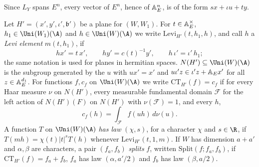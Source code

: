 Since $L_Y$ spans $E^n$, every vector of $E^n$, hence of $\mathbb{A}_E^n$, is of the form $sx+\iota u+ty$.

\begin{definition}\label{pf:thmK-cone:def-ct}
Let $H'=(x',y',\iota',\mathfrak b')$ be a plane for $(W,W_1)$.  For $t\in\mathbb{A}_E^\times$, $h_1\in\Uni(W_1)(\A)$ and
$h\in\Uni(W)(\A)$ we write $\mathrm{Levi}_{H'}(t,h_1,h)$, and call $h$ a \emph{Levi element} $m(t,h_1)$, if
\[
  hx'=t\,x',\qquad hy'=c(t)^{-1}y',\qquad h\,\iota'=\iota'\,h_1 ;
\]
the same notation is used for planes in hermitian spaces.  $N(H')\subseteq\Uni(W)(\A)$ is the subgroup generated by the
$u$ with $ux'=x'$ and $u\iota'z\in\iota'z+\mathbb{A}_E x'$ for all $z\in\mathbb{A}_E^{d_1}$.  For functions $f,c_f$ on
$\Uni(W)(\A)$ we write $\mathrm{CT}_{H'}(f)=c_f$ if for every Haar measure $\nu$ on $N(H')$, every measurable fundamental
domain $\mathcal F$ for the left action of $N(H')(F)$ on $N(H')$ with $\nu(\mathcal F)=1$, and every $h$,
\[
  c_f(h)=\int_{\mathcal F}f(uh)\,d\nu(u).
\]
A function $T$ on $\Uni(W)(\A)$ \emph{has law} $(\chi,s)$, for a character $\chi$ and $s\in\R$, if $T(mh)=\chi(t)|t|^sT(h)$
whenever $\mathrm{Levi}_{H'}(t,1,m)$.  If $W$ has dimension $a+a'$ and $\alpha,\beta$ are characters, a pair $(f_a,f_b)$
\emph{splits} $f$, written $\mathrm{Split}(f;f_a,f_b)$, if $\mathrm{CT}_{H'}(f)=f_a+f_b$, $f_a$ has law $(\alpha,a'/2)$ and
$f_b$ has law $(\beta,a/2)$.
\end{definition}

